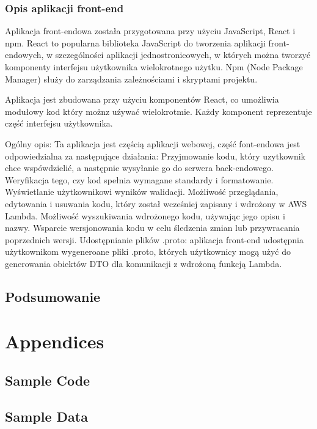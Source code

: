 \documentclass[runningheads,12pt]{llncs}
\begin{document}
\subsubsection{Opis aplikacji front-end}

Aplikacja front-endowa została przygotowana przy użyciu JavaScript, React i npm.
React to popularna biblioteka JavaScript do tworzenia aplikacji front-endowych, w szczególności aplikacji jednostronicowych, w których można tworzyć komponenty interfejsu użytkownika wielokrotnego użytku.
Npm (Node Package Manager) służy do zarządzania zależnościami i skryptami projektu.

Aplikacja jest zbudowana przy użyciu komponentów React, co umożliwia modułowy kod który możnz uźywać wielokrotmie. Każdy komponent reprezentuje część interfejsu użytkownika.

Ogólny opis:
Ta aplikacja jest częścią aplikacji webowej, część font-endowa jest odpowiedzialna  za następujące działania:
Przyjmowanie kodu, który uzytkownik chce wspówdzielić, a następnie wysyłanie go do serwera back-endowego.
Weryfikacja tego, czy kod spełnia wymagane standardy i formatowanie.
Wyświetlanie użytkownikowi wyników walidacji.
Możliwość przeglądania, edytowania i usuwania kodu, który został wcześniej zapisany i wdrożony w AWS Lambda.
Możliwość wyszukiwania wdrożonego kodu, używając jego opisu i nazwy.
Wsparcie wersjonowania kodu w celu śledzenia zmian lub przywracania poprzednich wersji.
Udostępnianie plików .proto: aplikacja front-end udostępnia użytkownikom wygeneroane pliki .proto, których uźytkownicy mogą użyć do generowania obiektów DTO dla komunikacji z wdrożoną funkcją Lambda.

\subsection{Podsumowanie}

\nocite{*}

\listoftables

\listoffigures




\section{Appendices}

\subsection{Sample Code}
\subsection{Sample Data}
\end{document}

